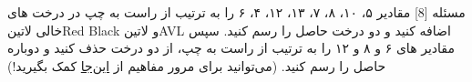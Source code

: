 
‌مسئله [8]
مقادیر ۵، ۱۰، ۸، ۷، ۱۳، ۱۲، ۴، ۶ را به ترتیب از راست به چپ در درخت های خالی ‌لاتین{Red Black} و ‌لاتین{AVL} اضافه کنید و دو درخت حاصل را رسم کنید. سپس مقادیر های ۶ و ۸ و ۱۲ را به ترتیب از راست به چپ، از دو درخت حذف کنید و دوباره حاصل را رسم کنید. 
(می‌توانید برای مرور مفاهیم از 
\href{https://www.cs.usfca.edu/~galles/visualization/Algorithms.html}{این‌جا}
 کمک بگیرید!)


% 
%
%
% 

\solution{
	
}




